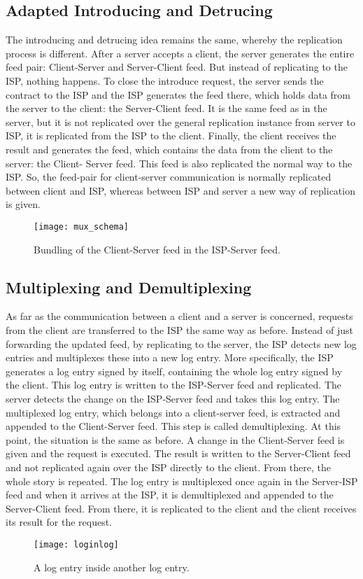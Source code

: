 \subsection{Adapted Introducing and Detrucing}
The introducing and detrucing idea remains the same, whereby the replication process is
different. After a server accepts a client, the server generates the entire feed pair: Client-Server and Server-Client feed. But instead of replicating to the ISP, nothing happens. To close the introduce request, the server sends the contract to the ISP and the ISP generates the feed there, which holds data from the server to the client: the Server-Client feed. It is the same feed as in the server, but it is not replicated over the general replication instance from server to ISP, it is replicated from the ISP to the client. Finally, the client receives the result and generates the feed, which contains the data from the client to the server: the Client- Server feed. This feed is also replicated the normal way to the ISP. So, the feed-pair for client-server communication is normally replicated between client and ISP, whereas between ISP and server a new way of replication is given.

\begin{figure}
    \centering
    \texttt{[image: mux\_schema]}
    \caption{Bundling of the Client-Server feed in the ISP-Server feed.}
    \label{fig:mux}
\end{figure}

\subsection{Multiplexing and Demultiplexing}
As far as the communication between a client and a server is concerned, requests from the client are transferred to the ISP the same way as before. Instead of just forwarding the updated feed, by replicating to the server, the ISP detects new log entries and multiplexes these into a new log entry.
More specifically, the ISP generates a log entry signed by itself, containing the whole log entry signed by the client. This log entry is written to the ISP-Server feed and replicated. The server detects the change on the ISP-Server feed and takes this log entry. The multiplexed log entry, which belongs into a client-server feed, is extracted and appended to the Client-Server feed. This step is called demultiplexing. At this point, the situation is the same as before. A change in the Client-Server feed is given and the request is executed. The result is written to the Server-Client feed and not replicated again over the ISP directly to the client. From there, the whole story is repeated. The log entry is multiplexed once again in the Server-ISP feed and when it arrives at the ISP, it is demultiplexed and appended to the Server-Client feed. From there, it is replicated to the client and the client receives its result for the request.
\begin{figure}
    \centering
    \texttt{[image: loginlog]}
    \caption{A log entry inside another log entry.}
    \label{fig:loginlog}
\end{figure}


